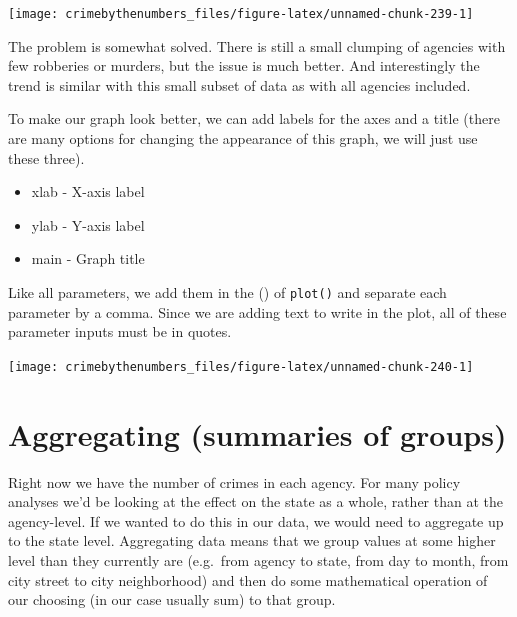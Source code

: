 \documentclass[
  a4paper,
]{krantz}
\makeatletter
\newenvironment{Shaded}{\begin{snugshade}}{\end{snugshade}}
\newcommand{\AttributeTok}[1]{\textcolor[rgb]{0.77,0.63,0.00}{#1}}
\newcommand{\FunctionTok}[1]{\textcolor[rgb]{0.00,0.00,0.00}{#1}}
\newcommand{\NormalTok}[1]{#1}
\newcommand{\SpecialCharTok}[1]{\textcolor[rgb]{0.00,0.00,0.00}{#1}}
\newcommand{\StringTok}[1]{\textcolor[rgb]{0.31,0.60,0.02}{#1}}
\providecommand{\tightlist}{%
  \setlength{\itemsep}{0pt}\setlength{\parskip}{0pt}}
\newenvironment{kframe}{%
\medskip{}
\setlength{\fboxsep}{.8em}
 \def\at@end@of@kframe{}%
 \ifinner\ifhmode%
  \def\at@end@of@kframe{\end{minipage}}%
  \begin{minipage}{\columnwidth}%
 \fi\fi%
 \def\FrameCommand##1{\hskip\@totalleftmargin \hskip-\fboxsep
 \colorbox{shadecolor}{##1}\hskip-\fboxsep
     \hskip-\linewidth \hskip-\@totalleftmargin \hskip\columnwidth}%
 \MakeFramed {\advance\hsize-\width
   \@totalleftmargin\z@ \linewidth\hsize
   \@setminipage}}%
 {\par\unskip\endMakeFramed%
 \at@end@of@kframe}
\renewenvironment{Shaded}{\begin{kframe}}{\end{kframe}}
\makeatother
\begin{document}
\begin{center}\texttt{[image: crimebythenumbers\_files/figure-latex/unnamed-chunk-239-1]} \end{center}

The problem is somewhat solved. There is still a small
clumping of agencies with few robberies or murders, but the
issue is much better. And interestingly the trend is similar
with this small subset of data as with all agencies
included.

To make our graph look better, we can add labels for the
axes and a title (there are many options for changing the
appearance of this graph, we will just use these three).

\begin{itemize}
\tightlist
\item
  xlab - X-axis label
\item
  ylab - Y-axis label
\item
  main - Graph title
\end{itemize}

Like all parameters, we add them in the () of
\texttt{plot()} and separate each parameter by a comma.
Since we are adding text to write in the plot, all of these
parameter inputs must be in quotes.

\begin{Shaded}
\end{Shaded}

\begin{center}\texttt{[image: crimebythenumbers\_files/figure-latex/unnamed-chunk-240-1]} \end{center}

\hypertarget{aggregate}{%
\section{Aggregating (summaries of
groups)}\label{aggregate}}

Right now we have the number of crimes in each agency. For
many policy analyses we'd be looking at the effect on the
state as a whole, rather than at the agency-level. If we
wanted to do this in our data, we would need to aggregate up
to the state level. Aggregating data means that we group
values at some higher level than they currently are
(e.g.~from agency to state, from day to month, from city
street to city neighborhood) and then do some mathematical
operation of our choosing (in our case usually sum) to that
group.
\end{document}
